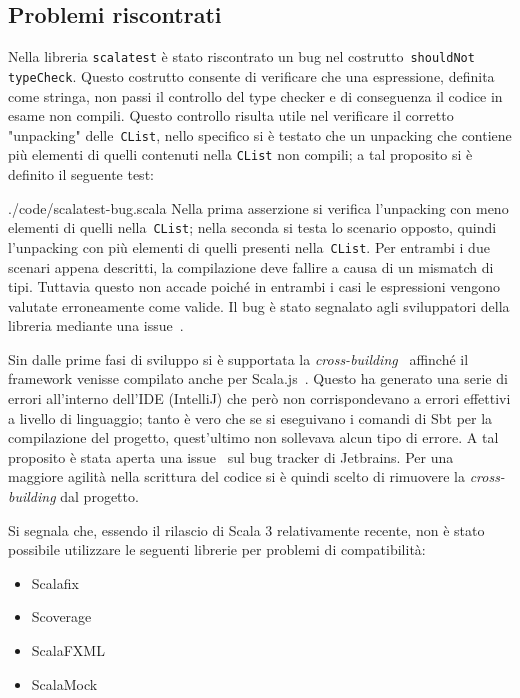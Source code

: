 \subsection{Problemi riscontrati}\label{subsec:problemi-riscontrati}
Nella libreria \texttt{scalatest} è stato riscontrato un bug nel costrutto~\texttt{shouldNot typeCheck}.
Questo costrutto consente di verificare che una espressione, definita come stringa, non passi il controllo del type
checker e di conseguenza il codice in esame non compili.
Questo controllo risulta utile nel verificare il corretto "unpacking" delle~\texttt{CList}, nello specifico si è testato
che un unpacking che contiene più elementi di quelli contenuti nella \texttt{CList} non compili;
a tal proposito si è definito il seguente test:

{./code/scalatest-bug.scala}
Nella prima asserzione si verifica l'unpacking con meno elementi di quelli nella~\texttt{CList};
nella seconda si testa lo scenario opposto, quindi l'unpacking con più elementi di quelli presenti nella~\texttt{CList}.
Per entrambi i due scenari appena descritti, la compilazione deve fallire a causa di un mismatch di tipi.
Tuttavia questo non accade poiché in entrambi i casi le espressioni vengono valutate erroneamente come valide.
Il bug è stato segnalato agli sviluppatori della libreria mediante una issue~\cite{scalatest-bug}.

Sin dalle prime fasi di sviluppo si è supportata la \textit{cross-building}~\cite{cross-building} affinché il
framework venisse compilato anche per Scala.js~\cite{scalajs}.
Questo ha generato una serie di errori all'interno dell'IDE (IntelliJ) che però non corrispondevano a errori effettivi
a livello di linguaggio;
tanto è vero che se si eseguivano i comandi di Sbt per la compilazione del progetto, quest'ultimo non sollevava alcun
tipo di errore.
A tal proposito è stata aperta una issue~\cite{intellij-issue} sul bug tracker di Jetbrains.
Per una maggiore agilità nella scrittura del codice si è quindi scelto di rimuovere la \textit{cross-building} dal
progetto.

Si segnala che, essendo il rilascio di Scala 3 relativamente recente, non è stato possibile utilizzare
le seguenti librerie per problemi di compatibilità:
\begin{itemize}
    \item Scalafix
    \item Scoverage
    \item ScalaFXML
    \item ScalaMock
\end{itemize}

